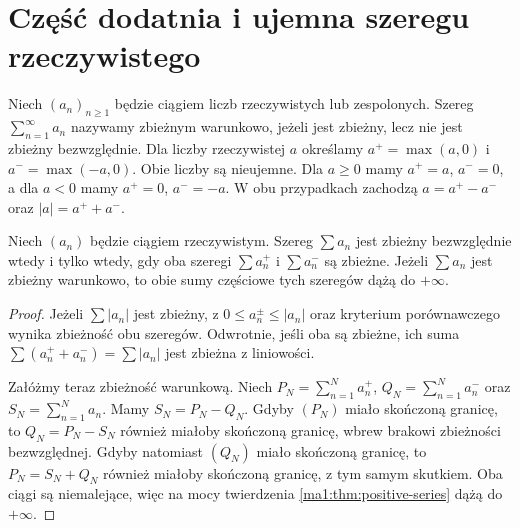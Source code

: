 \section{Część dodatnia i ujemna szeregu rzeczywistego}
\begin{definicja}
\label{ma1:def:conditional-series}
Niech $(a_n)_{n\ge1}$ będzie ciągiem liczb rzeczywistych lub zespolonych. Szereg $\sum_{n=1}^{\infty}a_n$ nazywamy zbieżnym warunkowo, jeżeli jest zbieżny, lecz nie jest zbieżny bezwzględnie.
Dla liczby rzeczywistej $a$ określamy $a^+=\max(a,0)$ i $a^-=\max(-a,0)$. Obie liczby są nieujemne. Dla $a\ge0$ mamy $a^+=a$, $a^-=0$, a dla $a<0$ mamy $a^+=0$, $a^-=-a$. W obu przypadkach zachodzą $a=a^+-a^-$ oraz $|a|=a^++a^-$.
\end{definicja}
\begin{twierdzenie}
\label{ma1:thm:positive-negative-parts}
Niech $(a_n)$ będzie ciągiem rzeczywistym. Szereg $\sum a_n$ jest zbieżny bezwzględnie wtedy i tylko wtedy, gdy oba szeregi $\sum a_n^+$ i $\sum a_n^-$ są zbieżne. Jeżeli $\sum a_n$ jest zbieżny warunkowo, to obie sumy częściowe tych szeregów dążą do $+\infty$.
\end{twierdzenie}
\begin{proof}
Jeżeli $\sum|a_n|$ jest zbieżny, z $0\le a_n^\pm\le |a_n|$ oraz kryterium porównawczego wynika zbieżność obu szeregów. Odwrotnie, jeśli oba są zbieżne, ich suma $\sum(a_n^++a_n^-)=\sum|a_n|$ jest zbieżna z liniowości.

Załóżmy teraz zbieżność warunkową. Niech $P_N=\sum_{n=1}^N a_n^+$, $Q_N=\sum_{n=1}^N a_n^-$ oraz $S_N=\sum_{n=1}^N a_n$. Mamy $S_N=P_N-Q_N$. Gdyby $(P_N)$ miało skończoną granicę, to $Q_N=P_N-S_N$ również miałoby skończoną granicę, wbrew brakowi zbieżności bezwzględnej. Gdyby natomiast $(Q_N)$ miało skończoną granicę, to $P_N=S_N+Q_N$ również miałoby skończoną granicę, z tym samym skutkiem. Oba ciągi są niemalejące, więc na mocy twierdzenia \ref{ma1:thm:positive-series} dążą do $+\infty$.
\end{proof}

